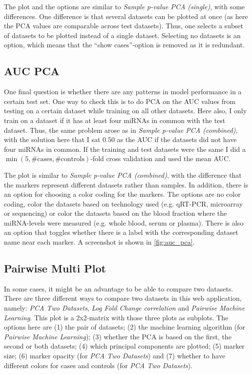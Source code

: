 {{{{{{{{{{{{{{{The plot and the options are similar to \textit{Sample p-value PCA (single)}, with some differences. One difference is that several datasets can be plotted at once (as here the PCA values are comparable across test datasets). Thus, one selects a subset of datasets to be plotted instead of a single dataset. Selecting no datasets is an option, which means that the ``show cases''-option is removed as it is redundant.

\subsection{AUC PCA}
One final question is whether there are any patterns in model performance in a certain test set. One way to check this is to do PCA on the AUC values from testing on a certain dataset while training on all other datasets. Here also, I only train on a dataset if it has at least four miRNAs in common with the test dataset. Thus, the same problem arose as in \textit{Sample p-value PCA (combined)}, with the solution here that I sat $0.50$ as the AUC if the datasets did not have four miRNAs in common. If the training and test datasets were the same I did a $\min(5, \text{\#cases}, \text{\#controls})$-fold cross validation and used the mean AUC.

The plot is similar to \textit{Sample p-value PCA (combined)}, with the difference that the markers represent different datasets rather than samples. In addition, there is an option for choosing a color coding for the markers. The options are no color coding, color the datasets based on technology used (e.g. qRT-PCR, microarray or sequencing) or color the datasets based on the blood fraction where the miRNA-levels were measured (e.g. whole blood, serum or plasma). There is also an option that toggles whether there is a label with the corresponding dataset name near each marker. A screenshot is shown in \autoref{fig:auc_pca}.

\subsection{Pairwise Multi Plot}


In some cases, it might be an advantage to be able to compare two datasets. There are three different ways to compare two datasets in this web application, namely: \textit{PCA Two Datasets}, \textit{Log Fold Change correlation} and \textit{Pairwise Machine Learning}. This plot is a 2x2-matrix with those three plots as subplots. The options here are (1) the pair of datasets; (2) the machine learning algorithm (for \textit{Pairwise Machine Learning}); (3) whether the PCA is based on the first, the second or both datasets; (4) which principal components are plotted; (5) marker size; (6) marker opacity (for \textit{PCA Two Datasets}) and (7) whether to have different colors for cases and controls (for \textit{PCA Two Datasets}).

}}}}}}}}}}}}}}}
